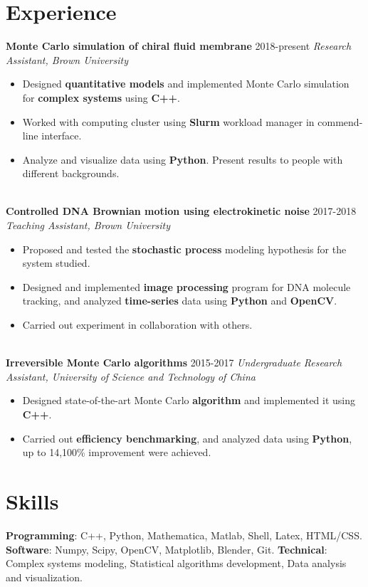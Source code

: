 \documentclass[10pt,letterpaper]{article}
\begin{document}
\section*{Experience}
\textbf{Monte Carlo simulation of chiral fluid membrane} \hfill 2018-present \newline
\emph{Research Assistant, Brown University}
\begin{itemize}
    \item Designed \textbf{quantitative models} and implemented Monte Carlo simulation for \textbf{complex systems} using \textbf{C++}.
    \item Worked with computing cluster using \textbf{Slurm} workload manager in commend-line interface.
    \item Analyze and visualize data using \textbf{Python}. Present results to people with different backgrounds.
\end{itemize}
~\\
\textbf{Controlled DNA Brownian motion using electrokinetic noise} \hfill 2017-2018 \newline
\emph{Teaching Assistant, Brown University}
\begin{itemize}
    \item Proposed and tested the \textbf{stochastic process} modeling hypothesis for the system studied.
    \item Designed and implemented \textbf{image processing} program for DNA molecule tracking, and analyzed \textbf{time-series} data using \textbf{Python} and \textbf{OpenCV}.
    \item Carried out experiment in collaboration with others.
\end{itemize}
~\\
\textbf{Irreversible Monte Carlo algorithms} \hfill 2015-2017 \newline
\emph{Undergraduate Research Assistant, University of Science and Technology of China}
\begin{itemize}
    \item Designed state-of-the-art Monte Carlo \textbf{algorithm} and implemented it using \textbf{C++}.
    \item Carried out \textbf{efficiency benchmarking}, and analyzed data using \textbf{Python}, up to 14,100\% improvement were achieved.
\end{itemize}
\section*{Skills}
\textbf{Programming}: C++, Python, Mathematica, Matlab, Shell, Latex, HTML/CSS. \newline
\textbf{Software}: Numpy, Scipy, OpenCV, Matplotlib, Blender, Git. \newline
\textbf{Technical}: Complex systems modeling, Statistical algorithms development, Data analysis and visualization.
\end{document}

